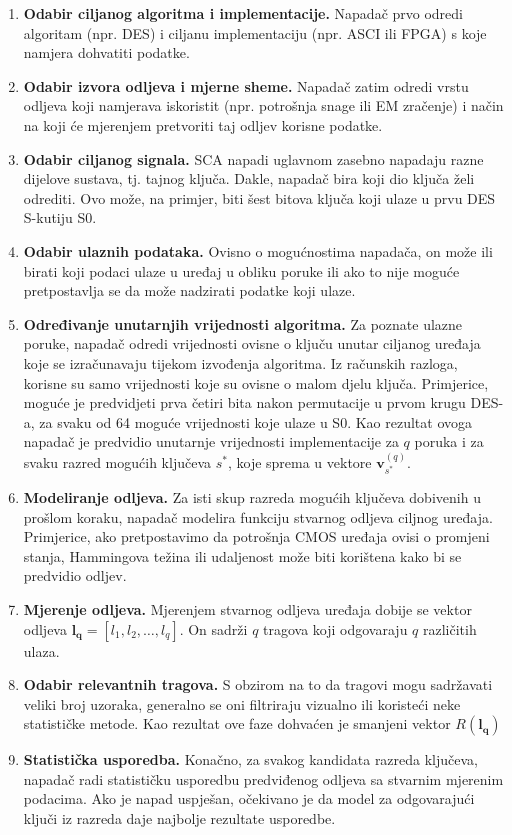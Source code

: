 \documentclass[times, utf8, diplomski]{fer}
\begin{document}
\begin{enumerate}
    \item{\textbf{Odabir ciljanog algoritma i implementacije.}} Napadač prvo odredi algoritam (npr. DES) i ciljanu implementaciju (npr. ASCI ili FPGA) s koje namjera dohvatiti podatke.
    \item{\textbf{Odabir izvora odljeva i mjerne sheme.}} Napadač zatim odredi vrstu odljeva koji namjerava iskoristit (npr. potrošnja snage ili EM zračenje) i način na koji će mjerenjem pretvoriti taj odljev korisne podatke.
    \item{\textbf{Odabir ciljanog signala.}} SCA napadi uglavnom zasebno napadaju razne dijelove sustava, tj. tajnog ključa. Dakle, napadač bira koji dio ključa želi odrediti. Ovo može, na primjer, biti šest bitova ključa koji ulaze u prvu DES S-kutiju S0.
    \item{\textbf{Odabir ulaznih podataka.}} Ovisno o mogućnostima napadača, on može ili birati koji podaci ulaze u uređaj u obliku poruke ili ako to nije moguće pretpostavlja se da može nadzirati podatke koji ulaze.
    \item{\textbf{Određivanje unutarnjih vrijednosti algoritma.}} Za poznate ulazne poruke, napadač odredi vrijednosti ovisne o ključu unutar ciljanog uređaja koje se izračunavaju tijekom izvođenja algoritma. Iz računskih razloga, korisne su samo vrijednosti koje su ovisne o malom djelu ključa. Primjerice, moguće je predvidjeti prva četiri bita nakon permutacije u prvom krugu DES-a, za svaku od 64 moguće vrijednosti koje ulaze u S0. Kao rezultat ovoga napadač je predvidio unutarnje vrijednosti implementacije za $q$ poruka i za svaku razred mogućih ključeva $s^*$, koje sprema u vektore $\bm{v}_{s^*}^{(q)}$.
    \item{\textbf{Modeliranje odljeva.}} Za isti skup razreda mogućih ključeva dobivenih u prošlom koraku, napadač modelira funkciju stvarnog odljeva ciljnog uređaja. Primjerice, ako pretpostavimo da potrošnja CMOS uređaja ovisi o promjeni stanja, Hammingova težina ili udaljenost može biti korištena kako bi se predvidio odljev.
    \item{\textbf{Mjerenje odljeva.}} Mjerenjem stvarnog odljeva uređaja dobije se vektor odljeva $\bm{l_q} = \left[ l_1, l_2, \dots, l_q \right]$. On sadrži $q$ tragova koji odgovaraju $q$ različitih ulaza.
    \item{\textbf{Odabir relevantnih tragova.}} S obzirom na to da tragovi mogu sadržavati veliki broj uzoraka, generalno se oni filtriraju vizualno ili koristeći neke statističke metode. Kao rezultat ove faze dohvaćen je smanjeni vektor $R(\bm{l_q})$
    \item{\textbf{Statistička usporedba.}} Konačno, za svakog kandidata razreda ključeva, napadač radi statističku usporedbu predviđenog odljeva sa stvarnim mjerenim podacima. Ako je napad uspješan, očekivano je da model za odgovarajući ključi iz razreda daje najbolje rezultate usporedbe.
\end{enumerate}
\end{document}

